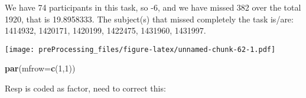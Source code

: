 \documentclass[
]{article}
\newenvironment{Shaded}{\begin{snugshade}}{\end{snugshade}}
\newcommand{\DataTypeTok}[1]{\textcolor[rgb]{0.13,0.29,0.53}{#1}}
\newcommand{\DecValTok}[1]{\textcolor[rgb]{0.00,0.00,0.81}{#1}}
\newcommand{\KeywordTok}[1]{\textcolor[rgb]{0.13,0.29,0.53}{\textbf{#1}}}
\newcommand{\NormalTok}[1]{#1}
\newcommand{\OperatorTok}[1]{\textcolor[rgb]{0.81,0.36,0.00}{\textbf{#1}}}
\newcommand{\StringTok}[1]{\textcolor[rgb]{0.31,0.60,0.02}{#1}}
\begin{document}
We have 74 participants in this task, so -6, and we have missed 382 over
the total 1920, that is 19.8958333. The subject(s) that missed
completely the task is/are: 1414932, 1420171, 1420199, 1422475, 1431960,
1431997.

\begin{Shaded}
\end{Shaded}

\texttt{[image: preProcessing\_files/figure-latex/unnamed-chunk-62-1.pdf]}

\begin{Shaded}
\begin{Highlighting}[]
\KeywordTok{par}\NormalTok{(}\DataTypeTok{mfrow=}\KeywordTok{c}\NormalTok{(}\DecValTok{1}\NormalTok{,}\DecValTok{1}\NormalTok{))}
\end{Highlighting}
\end{Shaded}

Resp is coded as factor, need to correct this:

\begin{Shaded}
\end{Shaded}

\begin{Shaded}
\end{Shaded}
\end{document}
